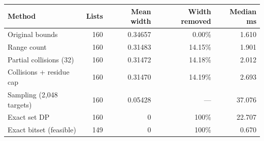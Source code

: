 \begin{tabular}{lrrrr}
\toprule
Method & Lists & Mean width & Width removed & Median ms\\
\midrule
Original bounds & 160 & 0.34657 & 0.00\% & 1.610\\
Range count & 160 & 0.31483 & 14.15\% & 1.901\\
Partial collisions (32) & 160 & 0.31472 & 14.18\% & 2.012\\
Collisions + residue cap & 160 & 0.31470 & 14.19\% & 2.693\\
Sampling (2,048 targets) & 160 & 0.05428 & --- & 37.076\\
Exact set DP & 160 & 0 & 100\% & 22.707\\
Exact bitset (feasible) & 149 & 0 & 100\% & 0.670\\
\bottomrule
\end{tabular}
